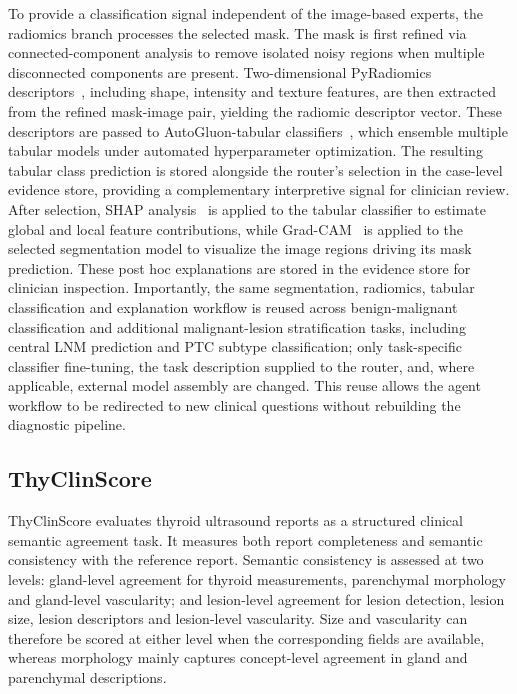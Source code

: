 \documentclass[fleqn,10pt]{wlscirep}
\begin{document}
To provide a classification signal independent of the image-based experts, the radiomics branch processes the selected mask. The mask is first refined via connected-component analysis to remove isolated noisy regions when multiple disconnected components are present. Two-dimensional PyRadiomics descriptors~\cite{van2017computational}, including shape, intensity and texture features, are then extracted from the refined mask-image pair, yielding the radiomic descriptor vector. These descriptors are passed to AutoGluon-tabular classifiers~\cite{erickson2020autogluon}, which ensemble multiple tabular models under automated hyperparameter optimization. The resulting tabular class prediction is stored alongside the router's selection in the case-level evidence store, providing a complementary interpretive signal for clinician review. After selection, SHAP analysis~\cite{lundberg2017unified} is applied to the tabular classifier to estimate global and local feature contributions, while Grad-CAM~\cite{selvaraju2017gradcam} is applied to the selected segmentation model to visualize the image regions driving its mask prediction. These post hoc explanations are stored in the evidence store for clinician inspection. Importantly, the same segmentation, radiomics, tabular classification and explanation workflow is reused across benign-malignant classification and additional malignant-lesion stratification tasks, including central LNM prediction and PTC subtype classification; only task-specific classifier fine-tuning, the task description supplied to the router, and, where applicable, external model assembly are changed. This reuse allows the agent workflow to be redirected to new clinical questions without rebuilding the diagnostic pipeline.

\subsection{ThyClinScore}
ThyClinScore evaluates thyroid ultrasound reports as a structured clinical semantic agreement task. It measures both report completeness and semantic consistency with the reference report. Semantic consistency is assessed at two levels: gland-level agreement for thyroid measurements, parenchymal morphology and gland-level vascularity; and lesion-level agreement for lesion detection, lesion size, lesion descriptors and lesion-level vascularity. Size and vascularity can therefore be scored at either level when the corresponding fields are available, whereas morphology mainly captures concept-level agreement in gland and parenchymal descriptions.
\end{document}
